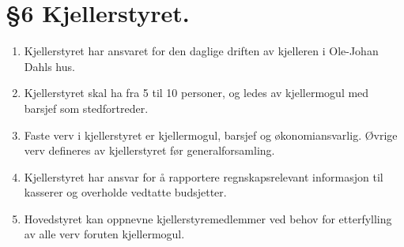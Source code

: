 \documentclass[10pt,norsk,a4paper]{article}
\begin{document}
\section*{§6 Kjellerstyret.}
\begin{enumerate}
	\item{Kjellerstyret har ansvaret for den daglige driften av kjelleren i Ole-Johan Dahls hus.}
	\item{Kjellerstyret skal ha fra 5 til 10 personer, og ledes av kjellermogul med barsjef som stedfortreder.}
	\item{Faste verv i kjellerstyret er kjellermogul, barsjef og økonomiansvarlig. Øvrige verv defineres av kjellerstyret før generalforsamling.}
	\item{Kjellerstyret har ansvar for å rapportere regnskapsrelevant informasjon til kasserer og overholde vedtatte budsjetter.}
	\item{Hovedstyret kan oppnevne kjellerstyremedlemmer ved behov for etterfylling av alle verv foruten kjellermogul.}
\end{enumerate}
\end{document}
